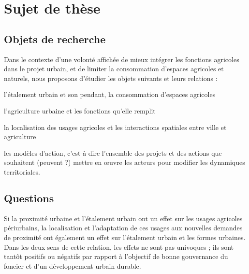 \section{Sujet de thèse}

\subsection{Objets de recherche}

Dans le contexte d'une volonté affichée de mieux intégrer les fonctions agricoles
dans le projet urbain,
et de limiter la consommation d'espaces agricoles et naturels,
nous proposons d'étudier les objets suivants et leurs relations :

\startitemize[packed]

\item l'étalement urbain et son pendant, la consommation d'espaces agricoles
\item l'agriculture urbaine et les fonctions qu'elle remplit
\item la localisation des usages agricoles
  et les interactions spatiales entre ville et agriculture
\item les modèles d'action, c'est-à-dire l'ensemble
  des projets et des actions que souhaitent (peuvent ?) mettre en œuvre
  les acteurs pour modifier les dynamiques territoriales.

\stopitemize

\subsection{Questions}


Si la proximité urbaine
et l'étalement urbain ont un effet sur les usages agricoles
périurbains, la localisation et l'adaptation de ces usages
aux nouvelles demandes de proximité
ont également un effet sur l'étalement urbain et les formes urbaines.
Dans les deux sens de cette relation, les effets ne sont pas univoques ;
ils sont tantôt positifs ou négatifs par rapport à l'objectif de bonne gouvernance
du foncier et d'un développement urbain durable.



